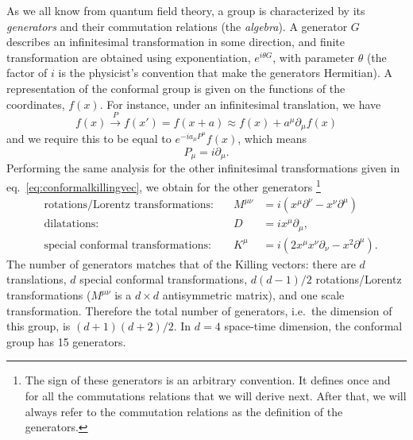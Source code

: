 \documentclass[a4paper,12pt]{article}
\numberwithin{equation}{section}
\begin{document}
As we all know from quantum field theory, a group is characterized by its \emph{generators} and their commutation relations (the \emph{algebra}). A generator $G$ describes an infinitesimal transformation in some direction, and finite transformation are obtained using exponentiation, $e^{i \theta G}$, with parameter $\theta$ (the factor of $i$ is the physicist's convention that make the generators Hermitian).
A representation of the conformal group is given on the functions of the coordinates, $f(x)$. For instance, under an infinitesimal translation, we have
\begin{equation}
	f(x) \xrightarrow{P} f(x') = f(x + a) \approx f(x)
	+ a^\mu \partial_\mu f(x)
\end{equation}
and we require this to be equal to $e^{-i a_\mu P^\mu} f(x)$, which means
\begin{equation}
	P_\mu = i \partial_\mu.
	\label{eq:P:fcts}
\end{equation}
Performing the same analysis for the other infinitesimal transformations given in eq.~\eqref{eq:conformalkillingvec}, we obtain for the other generators%
%
\footnote{The sign of these generators is an arbitrary convention. It defines once and for all the commutations relations that we will derive next. After that, we will always refer to the commutation relations as the definition of the generators.}
\begin{align}
	& \text{rotations/Lorentz transformations:} \quad &
	M^{\mu\nu} &= i \left( x^\mu \partial^\nu
	- x^\nu \partial^\mu \right)
	\label{eq:M:fcts}
	\\
	& \text{dilatations:} & 
	D &= i x^\mu \partial_\mu,
	\label{eq:D:fcts}
	\\
	& \text{special conformal transformations:} &
	K^\mu &= i \left( 2 x^\mu x^\nu \partial_\nu 
	- x^2 \partial^\mu \right).
	\label{eq:K:fcts}
\end{align}
The number of generators matches that of the Killing vectors: there are $d$ translations, $d$ special conformal transformations, $d (d-1)/2$ rotations/Lorentz transformations ($M^{\mu\nu}$ is a $d \times d$ antisymmetric matrix), and one scale transformation.
Therefore the total number of generators, i.e.~the dimension of this group, is $(d + 1)(d + 2)/2$. In $d = 4$ space-time dimension, the conformal group has 15 generators.
\end{document}
